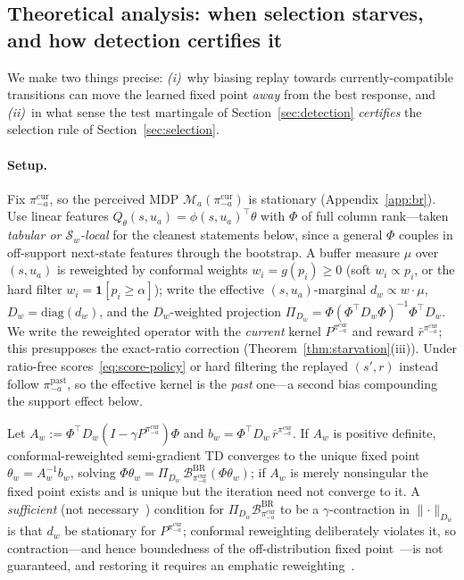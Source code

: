 \documentclass[sigconf]{aamas}
\newcommand{\picur}{\pi^{\mathrm{cur}}_{-a}}
\newcommand{\pipast}{\pi^{\mathrm{past}}_{-a}}
\newcommand{\Bop}{\mathcal{B}}
\newcommand{\indic}[1]{\mathbf{1}\!\left[#1\right]}
\newcommand{\Dw}{D_{w}}
\newcommand{\dw}{d_{w}}
\begin{document}
\subsection{Theoretical analysis: when selection starves, and how detection
certifies it}
\label{sec:theory}
We make two things precise: \emph{(i)}~why biasing replay towards
currently-compatible transitions can move the learned fixed point \emph{away}
from the best response, and \emph{(ii)}~in what sense the test martingale of
Section~\ref{sec:detection} \emph{certifies} the selection rule of
Section~\ref{sec:selection}.

\paragraph{Setup.} Fix $\picur$, so the perceived MDP $\mathcal{M}_a(\picur)$ is
stationary (Appendix~\ref{app:br}). Use linear features
$Q_\theta(s,u_a)=\phi(s,u_a)^\top\theta$ with $\Phi$ of full column rank---taken
\emph{tabular or $\mathcal{S}_w$-local} for the cleanest statements below, since a
general $\Phi$ couples in off-support next-state features through the bootstrap. A
buffer measure $\mu$ over $(s,u_a)$ is reweighted by conformal weights
$w_i=g(p_i)\ge0$ (soft $w_i\propto p_i$, or the hard filter
$w_i=\indic{p_i\ge\alpha}$); write the effective $(s,u_a)$-marginal $\dw\propto
w\cdot\mu$, $\Dw=\mathrm{diag}(\dw)$, and the $\Dw$-weighted projection
$\Pi_{\Dw}=\Phi(\Phi^\top\Dw\Phi)^{-1}\Phi^\top\Dw$. We write the reweighted
operator with the \emph{current} kernel $P^{\picur}$ and reward $\bar r^{\picur}$;
this presupposes the exact-ratio correction (Theorem~\ref{thm:starvation}(iii)).
Under ratio-free scores~\eqref{eq:score-policy} or hard filtering the replayed
$(s',r)$ instead follow $\pipast$, so the effective kernel is the \emph{past}
one---a second bias compounding the support effect below.

\begin{proposition}
\label{prop:fixedpoint}
Let $A_w:=\Phi^\top\Dw(I-\gamma P^{\picur})\Phi$ and $b_w=\Phi^\top\Dw\,\bar
r^{\picur}$. If $A_w$ is positive definite, conformal-reweighted semi-gradient TD
converges to the unique fixed point $\theta_w=A_w^{-1}b_w$, solving
$\Phi\theta_w=\Pi_{\Dw}\,\Bop^{\mathrm{BR}}_{\picur}(\Phi\theta_w)$; if $A_w$ is
merely nonsingular the fixed point exists and is unique but the iteration need not
converge to it. A \emph{sufficient} (not necessary~\citep{kolter2011fixed})
condition for $\Pi_{\Dw}\Bop^{\mathrm{BR}}_{\picur}$ to be a $\gamma$-contraction in
$\lVert\cdot\rVert_{\Dw}$ is that $\dw$ be stationary for $P^{\picur}$; conformal
reweighting deliberately violates it, so contraction---and hence boundedness of the
off-distribution fixed point~\citep{kolter2011fixed,tsitsiklis1997analysis}---is not
guaranteed, and restoring it requires an emphatic
reweighting~\citep{sutton2016emphatic}.
\end{proposition}
\end{document}
